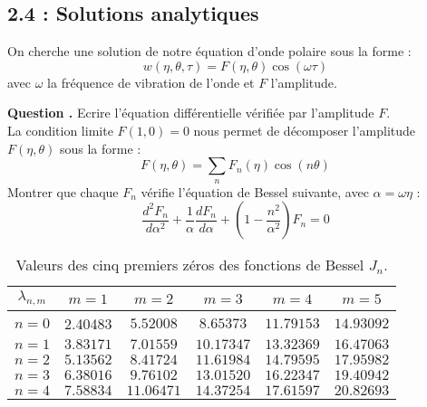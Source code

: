 \documentclass[a4,12pt]{article}
\newcounter{Nbquestion}
\newcommand*\question{%
  \stepcounter{Nbquestion}%
  \textbf{Question \theNbquestion. }}
\begin{document}

			    \subsection*{2.4 : Solutions analytiques }
			    On cherche une solution de notre équation d'onde polaire sous la forme :
			    \[
			      w(\eta,\theta,\tau)=F(\eta,\theta)\cos(\omega \tau)
			    \]
			    avec $\omega$ la fréquence de vibration de l'onde et $F$ l'amplitude.


			    \question Ecrire l'équation différentielle vérifiée par l'amplitude $F$.\\

			    La condition limite $F(1,0)=0$ nous permet de décomposer l'amplitude $F(\eta,\theta)$ sous la forme :
			    \[
			      F(\eta,\theta)=\sum_n F_n(\eta)\cos(n\theta)
			    \]
			    Montrer que chaque $F_n$ vérifie l'équation de Bessel suivante, avec  $\alpha=\omega\eta$ :
			    \[
			      \frac{d^2 F_n}{d\alpha^2}+\frac{1}{\alpha}\frac{dF_n}{d\alpha}+\left(1-\frac{n^2}{\alpha^2}\right)F_n=0
			    \]


			    \begin{table}
			      \begin{center}
				\begin{tabular}{|c|c|c|c|c|c|}
				  \hline
				  $\lambda_{n,m}$&$m=1$  &$m=2$ & $m=3$ &$ m=4$&$m=5$\\
				  \hline
				  $n=0$&2.40483&$5.52008$&$8.65373$&$11.79153$&$14.93092$\\
				  \hline
				  $n=1$&$3.83171$&$7.01559$&$10.17347$&$13.32369$&$16.47063$\\
				  \hline
				  $n=2$&$5.13562$&$8.41724$&$11.61984$&$14.79595$&$17.95982$\\
				  \hline
				  $n=3$&$6.38016$&$9.76102$&$13.01520$&$16.22347$&$19.40942$\\
				  \hline
				  $n=4$&$7.58834$&$11.06471$&$14.37254$&$17.61597$&$20.82693$\\
				  \hline
				\end{tabular}
				\caption{Valeurs des cinq premiers zéros des fonctions de Bessel $J_n$.}
			      \end{center}
			    \end{table}
\end{document}
